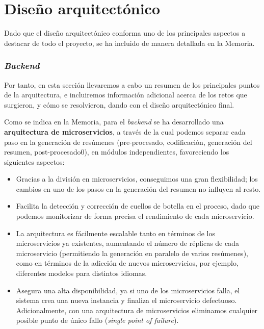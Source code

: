 \section{Diseño arquitectónico}

Dado que el diseño arquitectónico conforma uno de los principales aspectos a destacar de todo el proyecto, se ha incluido de manera detallada en la Memoria.

\subsubsection{\Large \emph{Backend}}

Por tanto, en esta sección llevaremos a cabo un resumen de los principales puntos de la arquitectura, e incluiremos información adicional acerca de los retos que surgieron, y cómo se resolvieron, dando con el diseño arquitectónico final.

Como se indica en la Memoria, para el \emph{backend} se ha desarrollado una \textbf{arquitectura de microservicios}, a través de la cual podemos separar cada paso en la generación de resúmenes (pre-procesado, codificación, generación del resumen, post-procesado0), en módulos independientes, favoreciendo los siguientes aspectos:

\vspace{-0.2cm}
\begin{itemize} [\textbullet]
	\item Gracias a la división en microservicios, conseguimos una gran flexibilidad; los cambios en uno de los pasos en la generación del resumen no influyen al resto.
	
	\item Facilita la detección y corrección de cuellos de botella en el proceso, dado que podemos monitorizar de forma precisa el rendimiento de cada microservicio.
	
	\item La arquitectura es fácilmente escalable tanto en términos de los microservicios ya existentes, aumentando el número de réplicas de cada microservicio (permitiendo la generación en paralelo de varios resúmenes), como en términos de la adicción de nuevos microservicios, por ejemplo, diferentes modelos para distintos idiomas.
	
	\item Asegura una alta disponibilidad, ya si uno de los microservicios falla, el sistema crea una nueva instancia y finaliza el microservicio defectuoso. Adicionalmente, con una arquitectura de microservicios eliminamos cualquier posible punto de único fallo (\emph{single point of failure}).
\end{itemize}

